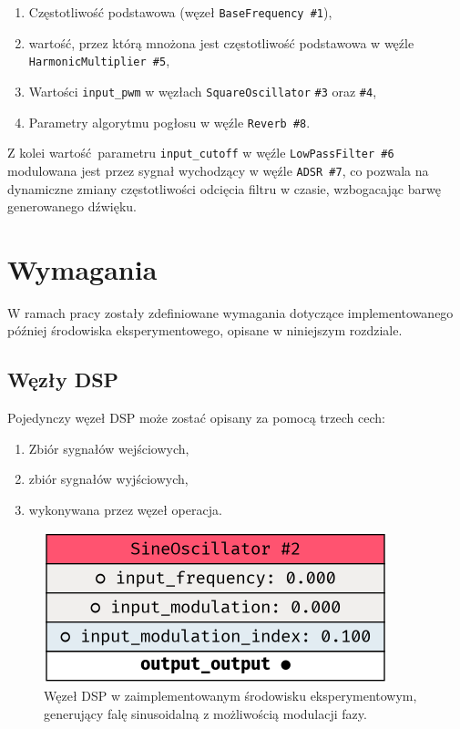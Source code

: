 \begin{enumerate}
  \item Częstotliwość podstawowa (węzeł \texttt{BaseFrequency \#1}),
  \item wartość, przez którą mnożona jest częstotliwość podstawowa w węźle \texttt{HarmonicMultiplier \#5},
  \item Wartości \texttt{input\_pwm} w węzłach \texttt{SquareOscillator} \texttt{\#3} oraz \texttt{\#4},
  \item Parametry algorytmu pogłosu w węźle \texttt{Reverb \#8}.
\end{enumerate}

\noindent
Z kolei wartość parametru \texttt{input\_cutoff} w węźle \texttt{LowPassFilter \#6} modulowana
jest przez sygnał wychodzący w węźle \texttt{ADSR \#7}, co pozwala na dynamiczne zmiany
częstotliwości odcięcia filtru w czasie, wzbogacając barwę generowanego dźwięku.

\section{Wymagania} \label{section:requirements}

W ramach pracy zostały zdefiniowane wymagania dotyczące implementowanego później środowiska eksperymentowego,
opisane w niniejszym rozdziale.

\subsection{Węzły DSP}

Pojedynczy węzeł DSP może zostać opisany za pomocą trzech cech:

\begin{enumerate}
  \item Zbiór sygnałów wejściowych,
  \item zbiór sygnałów wyjściowych,
  \item wykonywana przez węzeł operacja.
\end{enumerate}


\begin{figure}[H]
    \centering
    \includegraphics[width=0.4\linewidth]{rys02/example_sine_node.png}
    \caption{
      Węzeł DSP w zaimplementowanym środowisku eksperymentowym, generujący falę sinusoidalną z możliwością modulacji fazy.
    }
    \label{fig:example_sine_node}
\end{figure}

